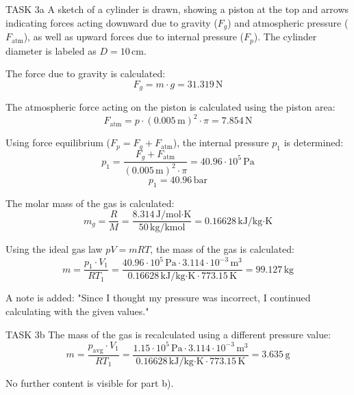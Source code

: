 TASK 3a  
A sketch of a cylinder is drawn, showing a piston at the top and arrows indicating forces acting downward due to gravity (\( F_g \)) and atmospheric pressure (\( F_{\text{atm}} \)), as well as upward forces due to internal pressure (\( F_p \)). The cylinder diameter is labeled as \( D = 10 \, \text{cm} \).  

The force due to gravity is calculated:  
\[
F_g = m \cdot g = 31.319 \, \text{N}
\]  

The atmospheric force acting on the piston is calculated using the piston area:  
\[
F_{\text{atm}} = p \cdot \left( 0.005 \, \text{m} \right)^2 \cdot \pi = 7.854 \, \text{N}
\]  

Using force equilibrium (\( F_p = F_g + F_{\text{atm}} \)), the internal pressure \( p_1 \) is determined:  
\[
p_1 = \frac{F_g + F_{\text{atm}}}{\left( 0.005 \, \text{m} \right)^2 \cdot \pi} = 40.96 \cdot 10^5 \, \text{Pa}
\]  
\[
p_1 = 40.96 \, \text{bar}
\]  

The molar mass of the gas is calculated:  
\[
m_g = \frac{R}{M} = \frac{8.314 \, \text{J/mol·K}}{50 \, \text{kg/kmol}} = 0.16628 \, \text{kJ/kg·K}
\]  

Using the ideal gas law \( p V = m R T \), the mass of the gas is calculated:  
\[
m = \frac{p_1 \cdot V_1}{R T_1} = \frac{40.96 \cdot 10^5 \, \text{Pa} \cdot 3.114 \cdot 10^{-3} \, \text{m}^3}{0.16628 \, \text{kJ/kg·K} \cdot 773.15 \, \text{K}} = 99.127 \, \text{kg}
\]  

A note is added: "Since I thought my pressure was incorrect, I continued calculating with the given values."  

TASK 3b  
The mass of the gas is recalculated using a different pressure value:  
\[
m = \frac{p_{\text{avg}} \cdot V_1}{R T_1} = \frac{1.15 \cdot 10^5 \, \text{Pa} \cdot 3.114 \cdot 10^{-3} \, \text{m}^3}{0.16628 \, \text{kJ/kg·K} \cdot 773.15 \, \text{K}} = 3.635 \, \text{g}
\]  

No further content is visible for part b).